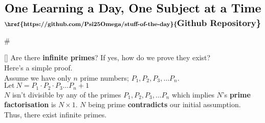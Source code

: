 \documentclass{article}
\begin{document}
\sffamily
\newenvironment{mathbox}[1][2]
{
  \vspace{1em}
  \begin{tcolorbox}[colback=yellow!50!white, colframe=yellow!60!red, title=#1]
  #
}
{
  \end{tcolorbox}
}
\newenvironment{phybox}[1][2]
{
  \vspace{1em}
  \begin{tcolorbox}[colback=blue!30!white, colframe=blue!80!white, title=#1]
  #
}
{
  \end{tcolorbox}
}
\newenvironment{chembox}[1][2]
{
  \vspace{1em}
  \begin{tcolorbox}[colback=red!30!white, colframe=red!90!white, title=#1]
  #
}
{
  \end{tcolorbox}
}
\newenvironment{biobox}[1][2]
{
  \vspace{1em}
  \begin{tcolorbox}[colback=green!30!white, colframe=green!90!black, title=#1]
  #
}
{
  \end{tcolorbox}
}
\begin{align*}
    \LARGE\textbf{One Learning a Day, One Subject at a Time}
\end{align*}
\begin{align*}
\textbf{\href{https://github.com/Psi25Omega/stuff-of-the-day}{\Large{Github Repository}}}
\end{align*}
\begin{mathbox}
[]
Are there \textbf{infinite primes}? If yes, how do we prove they exist?\\
Here's a simple proof.\\
Assume we have only $n$ prime numbers; $P_1, P_2, P_3, \dots P_n$.\\
$\text{Let}~N = P_1 \cdot P_2 \cdot P_3 \dots P_n + 1$\\
$N$ isn't divisible by any of the primes $P_1, P_2, P_3, \dots P_n$  which implies $N$'s \textbf{prime factorisation} is $N \times 1$. $N$ being prime \textbf{contradicts} our initial assumption.\\
Thus, there exist infinite primes.
\end{mathbox}
\end{document}
